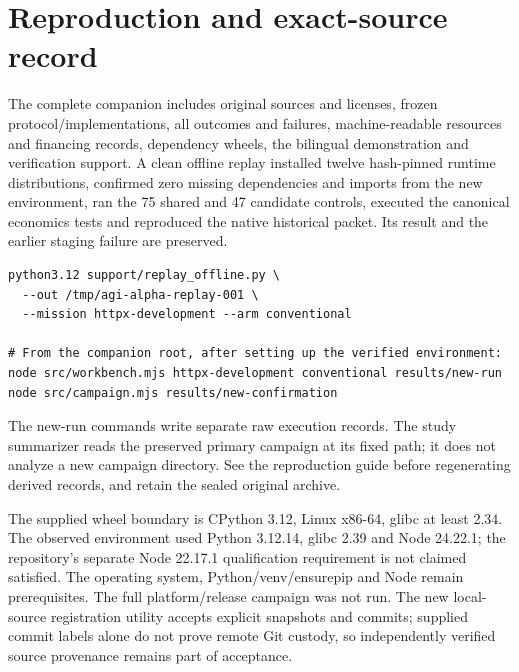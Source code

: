 \documentclass[11pt,letterpaper]{article}
\begin{document}
\section{Reproduction and exact-source record}
The complete companion includes original sources and licenses, frozen protocol/implementations, all outcomes and failures, machine-readable resources and financing records, dependency wheels, the bilingual demonstration and verification support. A clean offline replay installed twelve hash-pinned runtime distributions, confirmed zero missing dependencies and imports from the new environment, ran the 75 shared and 47 candidate controls, executed the canonical economics tests and reproduced the native historical packet. Its result and the earlier staging failure are preserved.

\begin{verbatim}
python3.12 support/replay_offline.py \
  --out /tmp/agi-alpha-replay-001 \
  --mission httpx-development --arm conventional

# From the companion root, after setting up the verified environment:
node src/workbench.mjs httpx-development conventional results/new-run
node src/campaign.mjs results/new-confirmation
\end{verbatim}

The new-run commands write separate raw execution records. The study summarizer reads the preserved primary campaign at its fixed path; it does not analyze a new campaign directory. See the reproduction guide before regenerating derived records, and retain the sealed original archive.

The supplied wheel boundary is CPython 3.12, Linux x86-64, glibc at least 2.34. The observed environment used Python 3.12.14, glibc 2.39 and Node 24.22.1; the repository's separate Node 22.17.1 qualification requirement is not claimed satisfied. The operating system, Python/venv/ensurepip and Node remain prerequisites. The full platform/release campaign was not run. The new local-source registration utility accepts explicit snapshots and commits; supplied commit labels alone do not prove remote Git custody, so independently verified source provenance remains part of acceptance.
\end{document}
